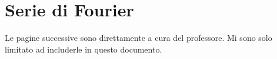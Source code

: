 \graphicspath{{05_serie_di_fourier/figures/PNG/}{05_serie_di_fourier/figures/PDF/}{05_serie_di_fourier/figures/}}


\chapter{Serie di Fourier}
Le pagine successive sono direttamente a cura del professore. Mi sono solo limitato ad includerle in questo documento.
\pagestyle{plain}
\copyrightnotice
%

